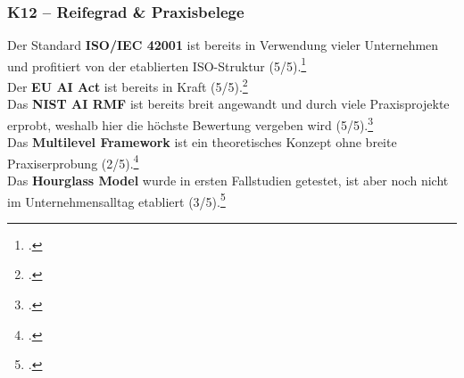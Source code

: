 \subsubsection{K12 – Reifegrad \& Praxisbelege}
Der Standard \textbf{ISO/IEC 42001} ist bereits in Verwendung vieler Unternehmen und profitiert von der etablierten ISO-Struktur (5/5).\footcite[][S.~vi--vii]{isoISOIEC42001}
\\
Der \textbf{EU AI Act} ist bereits in Kraft (5/5).\footcite[][S.~2--3]{europeanparliamentaryresearchserviceArtificialIntelligenceAct2024}
\\
Das \textbf{NIST AI RMF} ist bereits breit angewandt und durch viele Praxisprojekte erprobt, weshalb hier die höchste Bewertung vergeben wird (5/5).\footcite[][S.~3--6]{nationalinstituteofstandardsandtechnologyAIRiskManagement2021}
\\
Das \textbf{Multilevel Framework} ist ein theoretisches Konzept ohne breite Praxiserprobung (2/5).\footcite[][S.~7--12]{choungMultilevelFrameworkAI2023}
\\
Das \textbf{Hourglass Model} wurde in ersten Fallstudien getestet, ist aber noch nicht im Unternehmensalltag etabliert (3/5).\footcite[][S.~6--7]{mantymakiPDFPuttingAI2025}

